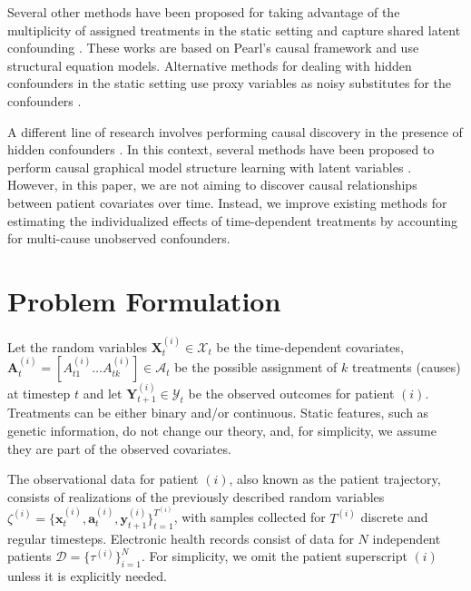 \documentclass{article}
\newcommand{\vc}[1]{\mathbf{#1}}
\newcommand{\cl}[1]{\mathcal{#1}}
\begin{document}
	Several other methods have been proposed for taking advantage of the multiplicity of assigned treatments in the static setting and capture shared latent confounding \cite{tran2017implicit, heckerman2018accounting, ranganath2018multiple}. These works are based on Pearl's causal framework \cite{pearl2009causality} and use structural equation models. Alternative methods for dealing with hidden confounders in the static setting use proxy variables as noisy substitutes for the confounders \cite{lash2014good, louizos2017causal, lee2018estimation}. 
	
     A different line of research involves performing causal discovery in the presence of hidden confounders \cite{spirtes2000causation}. In this context, several methods have been proposed to perform causal graphical model structure learning with latent variables \cite{leray2008causal, jabbari2017discovery, raghu2018comparison}. However, in this paper, we are not aiming to discover causal relationships between patient covariates over time. Instead, we improve existing methods for estimating the individualized effects of time-dependent treatments by accounting for multi-cause unobserved confounders. 
	
	
	\section{Problem Formulation}\label{sec:problem_formulation}
	
	Let the random variables $\vc{X}_t^{(i)} \in \cl{X}_t$ be the time-dependent covariates, $\vc{A}^{(i)}_t = [A_{t1}^{(i)} \dots A_{tk}^{(i)}]\in \cl{A}_t$ be the possible assignment of $k$ treatments (causes) at timestep $t$ and let $\vc{Y}_{t+1}^{(i)} \in \mathcal{Y}_t$ be the observed outcomes for patient $(i)$. Treatments can be either binary and/or continuous. Static features, such as genetic information, do not change our theory, and, for simplicity, we assume they are part of the observed covariates.  
	
	The observational data for patient $(i)$, also known as the patient trajectory, consists of realizations of the previously described random variables $\zeta^{(i)} = \{\vc{x}^{(i)}_{t},  \vc{a}^{(i)}_{t}, \vc{y}^{(i)}_{t+1} \}_{t=1}^{T^{(i)}}$, with samples collected for $T^{(i)}$ discrete and regular timesteps. Electronic health records consist of data for $N$ independent patients $\cl{D} = \{\tau^{(i)}\}_{i=1}^{N}$. For simplicity, we omit the patient superscript $(i)$ unless it is explicitly needed.
	
\end{document}
